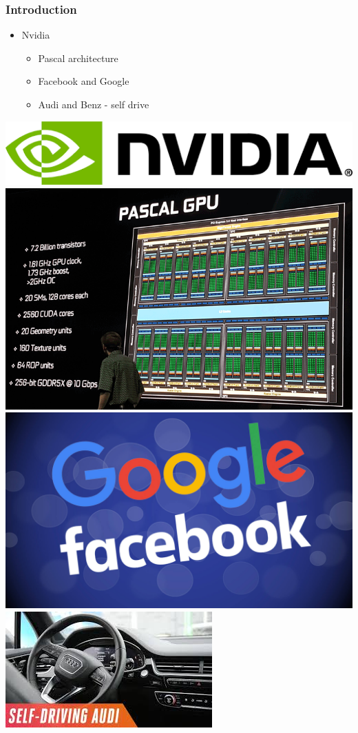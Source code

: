 \documentclass{beamer}
\begin{document}
\begin{frame}
\frametitle{Introduction}
\begin{itemize}
	\item Nvidia
	\begin{itemize}
		\item {Pascal architecture}
		\item {Facebook and Google}
		\item {Audi and Benz - self drive}		
	\end{itemize}
\end{itemize}
\includegraphics[scale=0.3]{nvidia}
\includegraphics[scale=0.15]{pascal}
\includegraphics[scale=0.05]{Google-and-facebook}
\includegraphics[scale=0.3]{Audi}

\end{frame}
\end{document}
